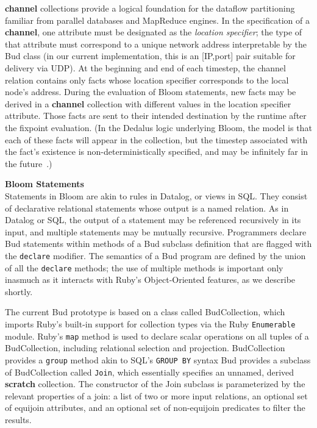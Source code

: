 {\bf channel} collections provide a logical foundation for the dataflow partitioning familiar from parallel databases and MapReduce engines.  In the specification of a {\bf channel}, one attribute must be designated as the {\em location specifier}; the type of that attribute must correspond to a unique network address interpretable by the Bud class (in our current implementation, this is an [IP,port] pair suitable for delivery via UDP).  At the beginning and end of each timestep, the channel relation contains only facts whose location specifier corresponds to the local node's address.  During the evaluation of Bloom statements, new facts may be derived in a {\bf channel} collection with different values in the location specifier attribute.  Those facts are sent to their intended destination by the runtime after the fixpoint evaluation.  (In the Dedalus logic underlying Bloom, the model is that each of these facts will appear in the collection, but the timestep associated with the fact's existence is non-deterministically specified, and may be infinitely far in the future~\cite{dedalus}.)

{\bf Bloom Statements}\\
\noindent
Statements in Bloom are akin to rules in Datalog, or views in SQL.  They consist of declarative relational statements whose output is a named relation.  As in Datalog or SQL, the output of a statement may be referenced recursively in its input, and multiple statements may be mutually recursive.  Programmers declare Bud statements within methods of a Bud subclass definition that are flagged with the {\tt declare} modifier.  The semantics of a Bud program are defined by the union of all the {\tt declare} methods; the use of multiple methods is important only inasmuch as it interacts with Ruby's Object-Oriented features, as we describe shortly.

The current Bud prototype is based on a class called BudCollection, which imports Ruby's built-in support for collection types via the Ruby {\tt Enumerable} module.  Ruby's {\tt map} method is used to declare scalar operations on all tuples of a BudCollection, including relational selection and projection.      BudCollection provides a {\tt group} method akin to SQL's {\tt GROUP BY} syntax       Bud provides a subclass of BudCollection called {\tt Join}, which essentially specifies an unnamed, derived {\bf scratch} collection.  The constructor of the Join subclass is parameterized by the relevant properties of a join: a list of two or more input relations, an optional set of equijoin attributes, and an optional set of non-equijoin predicates to filter the results.  

